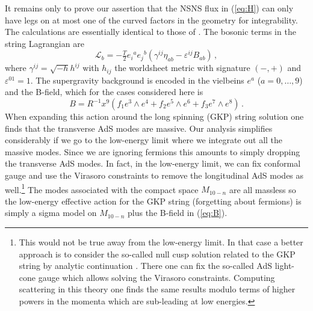 \documentclass[a4paper,11pt]{article}
\begin{document}
It remains only to prove our assertion that the NSNS flux in (\ref{eq:H}) can only have legs on at most one of the curved factors in the geometry for integrability. The calculations are essentially identical to those of \cite{Wulff:2017hzy}. The bosonic terms in the string Lagrangian are
\begin{equation}
\mathcal L_b=
-\tfrac{T}{2}e_i{}^ae_j{}^b(\gamma^{ij}\eta_{ab}-\varepsilon^{ij}B_{ab})\,,
\label{eq:Lb}
\end{equation}
where $\gamma^{ij}=\sqrt{-h}h^{ij}$ with $h_{ij}$ the worldsheet metric with signature $(-,+)$ and $\varepsilon^{01}=1$. The supergravity background is encoded in the vielbeins $e^a$ ($a=0,\ldots,9$) and the B-field, which for the cases considered here is
\begin{equation}
B=R^{-1}x^9(f_1e^3\wedge e^4+f_2e^5\wedge e^6+f_3e^7\wedge e^8)\,.
\label{eq:B}
\end{equation}
When expanding this action around the long spinning (GKP) string solution one finds that the transverse AdS modes are massive. Our analysis simplifies considerably if we go to the low-energy limit where we integrate out all the massive modes. Since we are ignoring fermions this amounts to simply dropping the transverse AdS modes. In fact, in the low-energy limit, we can fix conformal gauge and use the Virasoro constraints to remove the longitudinal AdS modes as well.\footnote{This would not be true away from the low-energy limit. In that case a better approach is to consider the so-called null cusp solution related to the GKP string by analytic continuation \cite{Kruczenski:2007cy}. There one can fix the so-called AdS light-cone gauge which allows solving the Virasoro constraints. Computing scattering in this theory one finds the same results modulo terms of higher powers in the momenta which are sub-leading at low energies.} The modes associated with the compact space $M_{10-n}$ are all massless so the low-energy effective action for the GKP string (forgetting about fermions) is simply a sigma model on $M_{10-n}$ plus the B-field in (\ref{eq:B}).
\end{document}
